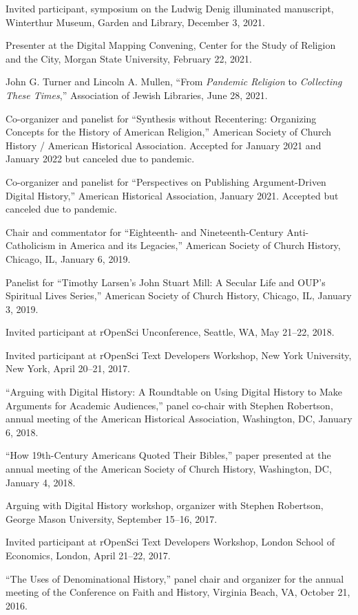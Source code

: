 \documentclass[11pt]{article}
\begin{document}
Invited participant, symposium on the Ludwig Denig illuminated manuscript, Winterthur Museum, Garden and Library, December 3, 2021.

Presenter at the Digital Mapping Convening, Center for the Study of Religion and the City, Morgan State University, February 22, 2021.

John G. Turner and Lincoln A. Mullen, ``From \emph{Pandemic Religion} to \emph{Collecting These Times},'' Association of Jewish Libraries, June 28, 2021.

Co-organizer and panelist for ``Synthesis without Recentering: Organizing Concepts for the History of American Religion,'' American Society of Church History / American Historical Association. Accepted for January 2021 and January 2022 but canceled due to pandemic.

Co-organizer and panelist for ``Perspectives on Publishing Argument-Driven Digital History,'' American Historical Association, January 2021. Accepted but canceled due to pandemic.

Chair and commentator for ``Eighteenth- and Nineteenth-Century Anti-Catholicism in America and its Legacies,'' American Society of Church History, Chicago, IL, January 6, 2019.

Panelist for ``Timothy Larsen's John Stuart Mill: A Secular Life and OUP's Spiritual Lives Series,'' American Society of Church History, Chicago, IL, January 3, 2019.

Invited participant at rOpenSci Unconference, Seattle, WA, May 21--22, 2018.

Invited participant at rOpenSci Text Developers Workshop, New York University, New York, April 20--21, 2017.

``Arguing with Digital History: A Roundtable on Using Digital History to Make Arguments for Academic Audiences,'' panel co-chair with Stephen Robertson, annual meeting of the American Historical Association, Washington, DC, January 6, 2018.

``How 19th-Century Americans Quoted Their Bibles,'' paper presented at the annual meeting of the American Society of Church History, Washington, DC, January 4, 2018.

Arguing with Digital History workshop, organizer with Stephen Robertson, George Mason University, September 15--16, 2017.

Invited participant at rOpenSci Text Developers Workshop, London School of Economics, London, April 21--22, 2017.

``The Uses of Denominational History,'' panel chair and organizer for the annual meeting of the Conference on Faith and History, Virginia Beach, VA, October 21, 2016.
\end{document}
